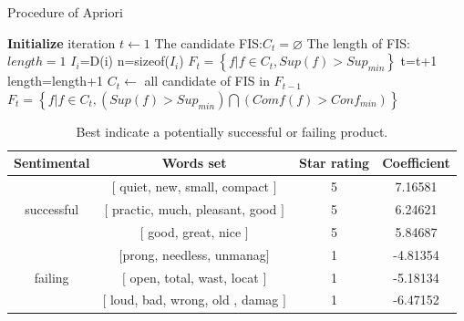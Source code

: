 \documentclass[12pt]{article}%
\begin{document}
\begin{algorithm}[H]
	\caption{Procedure of Apriori}  
	\LinesNumbered  
	\textbf{Initialize} \newline
	iteration $t\leftarrow 1$ \newline
	The candidate FIS:$C_{t}=\varnothing$ \newline
	The length of FIS:$length=1$ \newline
	{$I_{i}$=D(i)\newline
		n=sizeof($I_{i}$)\newline
	}
	$F_{t}=\left \{ f|f\in C_{t},Sup(f)>Sup_{min}\right \}$\newline
	{ t=t+1\newline 
		length=length+1\newline	
		$C_{t}\leftarrow $ all candidate of FIS in $F_{t-1}$\newline
		$F_{t}=\left \{ f|f\in C_{t},(Sup(f)>Sup_{min})\bigcap (Comf(f)>Conf_{min}) \right\}$\newline
	}	
\end{algorithm} 
\begin{table}[H]
	\centering
	\caption{Best indicate a potentially successful or failing product.	}	
	\begin{tabular}{c|ccc}
		\toprule[1.5pt]
		\multicolumn{1}{m{2cm}}{\centering Sentimental} &
		\multicolumn{1}{m{6cm}}{\centering Words set} & \multicolumn{1}{m{2cm}}{\centering Star rating}&
		\multicolumn{1}{m{2cm}}{\centering  Coefficient}\\
		\midrule[1pt]
		&$\big [$ quiet, new, small, compact $\big ]$ &5&7.16581\\
		successful	&$\big [$ practic, much, pleasant, good $\big ]$ &5&6.24621\\
		&$\big [$ good, great, nice $\big ]$ &5&5.84687\\
		\midrule[1pt]
		&$\big [$prong, needless, unmanag$\big ]$ &1&-4.81354\\
		failing	&$\big [$ open, total, wast, locat $\big ]$ &1&-5.18134\\
		&$\big [$ loud, bad, wrong, old , damag $\big ]$ &1&-6.47152\\
		\bottomrule[1.6pt]
	\end{tabular}
\end{table}
\end{document}
